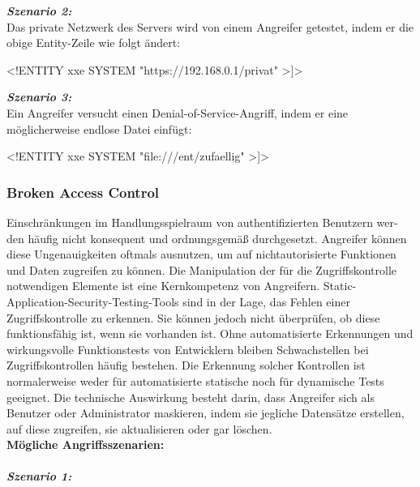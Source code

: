 \textbf{\textit{Szenario 2:}}\\
Das private Netzwerk des Servers wird von einem Angreifer getestet, indem er die obige Entity-Zeile wie folgt ändert\cite[10]{owasp17top10}:\\

\begin{LaTeXCode}[caption={XML-Beispiel 2},captionpos=b, label=LaTeXCode:xxe2][numbers=none]
<!ENTITY xxe SYSTEM "https://192.168.0.1/privat" >]>
\end{LaTeXCode}

\textbf{\textit{Szenario 3:}}\\
Ein Angreifer versucht einen Denial-of-Service-Angriff, indem er eine möglicherweise endlose Datei einfügt\cite[10]{owasp17top10}:\\

\begin{LaTeXCode}[caption={XML-Beispiel 3},captionpos=b, label=LaTeXCode:xxe3][numbers=none]
<!ENTITY xxe SYSTEM "file:///ent/zufaellig" >]>
\end{LaTeXCode}

\subsubsection{Broken Access Control}

Einschränkungen im Handlungsspielraum von authentifizierten Benutzern wer-den häufig nicht konsequent und ordnungsgemäß durchgesetzt. Angreifer können diese Ungenauigkeiten oftmals ausnutzen, um auf nichtautorisierte Funktionen und Daten zugreifen zu können. Die Manipulation der für die Zugriffskontrolle notwendigen Elemente ist eine Kernkompetenz von Angreifern. Static-Application-Security-Testing-Tools sind in der Lage, das Fehlen einer Zugriffskontrolle zu erkennen. Sie können jedoch nicht überprüfen, ob diese funktionsfähig ist, wenn sie vorhanden ist. Ohne automatisierte Erkennungen und wirkungsvolle Funktionstests von Entwicklern bleiben Schwachstellen bei Zugriffskontrollen häufig bestehen. Die Erkennung solcher Kontrollen ist normalerweise weder für automatisierte statische noch für dynamische Tests geeignet. Die technische Auswirkung besteht darin, dass Angreifer sich als Benutzer oder Administrator maskieren, indem sie jegliche Datensätze erstellen, auf diese zugreifen, sie aktualisieren oder gar löschen\cite[11]{owasp17top10}.\\

\textbf{Mögliche Angriffsszenarien:}\\
\\
\textbf{\textit{Szenario 1:}}\\

